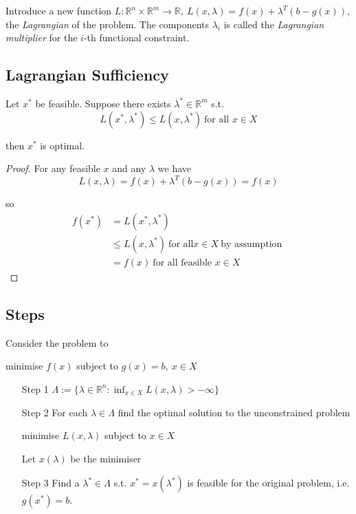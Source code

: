 \documentclass[a4paper]{article}
\begin{document}
Introduce a new function $L : \mathbb{R}^n × \mathbb{R}^m → \mathbb{R},\: L(x, \lambda) = f(x) + \lambda^T (b - g(x))$, the \emph{Lagrangian} of the problem. The components $\lambda_i$ is called the \emph{Lagrangian multiplier} for the $i$-th functional constraint.

\subsection{Lagrangian Sufficiency}

\begin{theorem}
  Let $x^*$ be feasible. Suppose there exists $\lambda^* \in \mathbb{R}^m$ s.t.
  \[
    L(x^*, \lambda^*) ≤ L(x, \lambda^*) \: \text{for all } x \in X
  \]

  then $x^*$ is optimal.

\end{theorem}

\begin{proof}
  For any feasible $x$ and any $\lambda$ we have
  \[
    L(x, \lambda) = f(x) + \lambda^T (b - g(x)) = f(x)
  \]

  so
  \begin{align*}
    f(x^*) &= L(x^*, \lambda^*) \\
           &≤ L(x, \lambda^*) \: \text{for all} x \in X \: \text{by assumption } \\
           &= f(x) \: \text{for all feasible } x \in X
  \end{align*}
\end{proof}

\subsection{Steps}

Consider the problem to

\begin{center}
  minimise $f(x)$ subject to $g(x) = b,\: x \in X$
\end{center}

\begin{itemize}
\item[Step 1] $\Lambda := \{\displaystyle \lambda \in \mathbb{R}^n: \inf_{x \in X} L(x, \lambda) > -∞\}$
\item[Step 2] For each $\lambda \in \Lambda$ find the optimal solution to the unconstrained problem

\begin{center}
  minimise $L(x, \lambda)$ subject to $x \in X$
\end{center}

Let $x(\lambda)$ be the minimiser
\item[Step 3] Find a $\lambda^* \in \Lambda$ s.t. $x^* = x(\lambda^*)$ is feasible for the original problem, i.e. $g(x^*) = b$.
\end{itemize}
\end{document}
